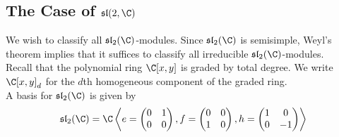 \documentclass[a4paper]{article}
\begin{document}
\subsection{The Case of $\mathfrak{sl}(2,\C)$}
We wish to classify all $\mathfrak{sl}_2(\C)$-modules. Since $\mathfrak{sl}_2(\C)$ is semisimple, Weyl's theorem implies that it suffices to classify all irreducible $\mathfrak{sl}_2(\C)$-modules. \\

Recall that the polynomial ring $\C[x,y]$ is graded by total degree. We write $\C[x,y]_d$ for the $d$th homogeneous component of the graded ring. \\

A basis for $\mathfrak{sl}_2(\C)$ is given by $$\mathfrak{sl}_2(\C)=\C\left\langle e=\begin{pmatrix}
0 & 1\\0 & 0
\end{pmatrix}, f=\begin{pmatrix}
0 & 0\\1 & 0
\end{pmatrix}, h=\begin{pmatrix}
1 & 0\\0 & -1
\end{pmatrix}\right\rangle$$
\end{document}
